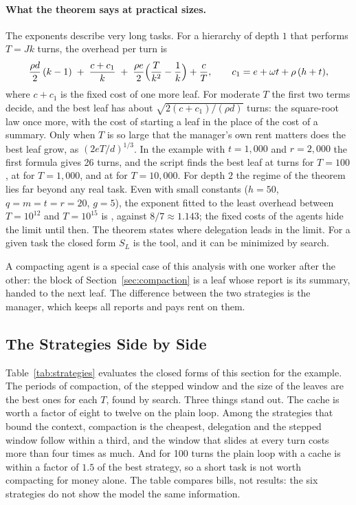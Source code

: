 \documentclass[acmsmall,nonacm,screen]{acmart}
\begin{document}
\paragraph{What the theorem says at practical sizes.} The exponents describe very long tasks.
For a hierarchy of depth $1$ that performs $T = Jk$ turns, the overhead per turn is
\[
\frac{\rho d}{2}\,(k - 1) \;+\; \frac{c + c_1}{k} \;+\; \frac{\rho e}{2}\Bigl(\frac{T}{k^2} - \frac{1}{k}\Bigr) + \frac{c}{T},
\qquad c_1 = e + \omega t + \rho\,(h + t) ,
\]
where $c + c_1$ is the fixed cost of one more leaf. For moderate $T$ the first two terms
decide, and the best leaf has about $\sqrt{2(c + c_1)/(\rho d)}$ turns: the square-root law
once more, with the cost of starting a leaf in the place of the cost of a summary. Only when
$T$ is so large that the manager's own rent matters does the best leaf grow, as
$(2eT/d)^{1/3}$. In the example with $t = 1{,}000$ and $r = 2{,}000$ the first formula gives
26 turns, and the script finds the best leaf at \exTabKHundred{} turns for $T = 100$, at
\exTabKThousand{} for $T = 1{,}000$, and at \exTabKTenK{} for $T = 10{,}000$. For depth $2$
the regime of the theorem lies far beyond any real task. Even with small constants
($h = 50$, $q = m = t = r = 20$, $g = 5$), the exponent fitted to the least overhead between
$T = 10^{12}$ and $T = 10^{15}$ is \exSlopeTwo{}, against $8/7 \approx 1.143$; the fixed costs
of the agents hide the limit until then. The theorem states where delegation leads in the
limit. For a given task the closed form $S_L$ is
the tool, and it can be minimized by search.

A compacting agent is a special case of this analysis with one worker after the other: the
block of Section~\ref{sec:compaction} is a leaf whose report is its summary, handed to the
next leaf. The difference between the two strategies is the manager, which keeps all reports
and pays rent on them.

\subsection{The Strategies Side by Side}

Table~\ref{tab:strategies} evaluates the closed forms of this section for the example. The
periods of compaction, of the stepped window and the size of the leaves are the best ones for
each $T$, found by search. Three things stand out. The cache is worth a factor of eight to
twelve on the plain loop. Among the strategies that bound the context, compaction is the
cheapest, delegation and the stepped window follow within a third, and the window that slides
at every turn costs more than four times as much. And for 100 turns the plain loop with a
cache is within a factor of $1.5$ of the best strategy, so a short task is not worth
compacting for money alone. The table compares bills, not results: the six strategies do not
show the model the same information.
\end{document}
